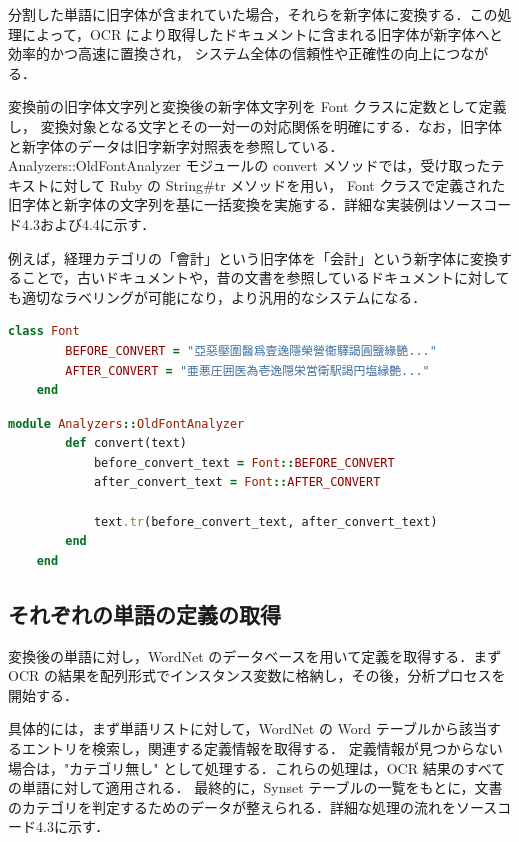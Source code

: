 分割した単語に旧字体が含まれていた場合，それらを新字体に変換する．この処理によって，OCR により取得したドキュメントに含まれる旧字体が新字体へと効率的かつ高速に置換され，
システム全体の信頼性や正確性の向上につながる．

変換前の旧字体文字列と変換後の新字体文字列を Font クラスに定数として定義し，
変換対象となる文字とその一対一の対応関係を明確にする．なお，旧字体と新字体のデータは旧字新字対照表を参照している\cite{kanji}．
Analyzers::OldFontAnalyzer モジュールの convert メソッドでは，受け取ったテキストに対して Ruby の String\#tr メソッドを用い，
Font クラスで定義された旧字体と新字体の文字列を基に一括変換を実施する．詳細な実装例はソースコード4.3および4.4に示す．

例えば，経理カテゴリの「會計」という旧字体を「会計」という新字体に変換することで，古いドキュメントや，昔の文書を参照しているドキュメントに対しても適切なラベリングが可能になり，より汎用的なシステムになる．

\begin{lstlisting}[language=Ruby, caption=Font クラスの定義]
    class Font
        BEFORE_CONVERT = "亞惡壓圍醫爲壹逸隱榮營衞驛謁圓鹽緣艷..."
        AFTER_CONVERT = "亜悪圧囲医為壱逸隠栄営衛駅謁円塩縁艶..."
    end
\end{lstlisting}

\begin{lstlisting}[language=Ruby, caption=新字体への変換]
    module Analyzers::OldFontAnalyzer
        def convert(text)
            before_convert_text = Font::BEFORE_CONVERT
            after_convert_text = Font::AFTER_CONVERT

            text.tr(before_convert_text, after_convert_text)
        end
    end
\end{lstlisting}

\clearpage

\subsection{それぞれの単語の定義の取得}
\label{subsec:app_synset}

変換後の単語に対し，WordNet のデータベースを用いて定義を取得する．まず OCR の結果を配列形式でインスタンス変数に格納し，その後，分析プロセスを開始する．

具体的には，まず単語リストに対して，WordNet の Word テーブルから該当するエントリを検索し，関連する定義情報を取得する．
定義情報が見つからない場合は，"カテゴリ無し" として処理する．これらの処理は，OCR 結果のすべての単語に対して適用される．
最終的に，Synset テーブルの一覧をもとに，文書のカテゴリを判定するためのデータが整えられる．詳細な処理の流れをソースコード4.3に示す．

